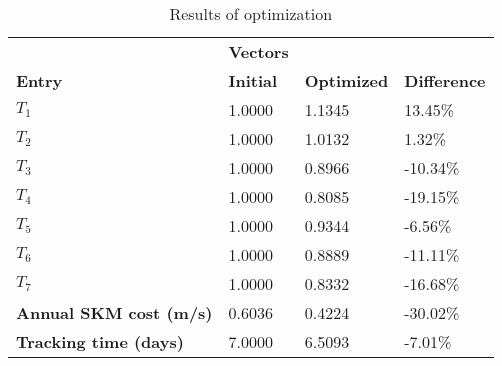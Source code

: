 \begin{table}[H]
\centering
\begin{tabular}{llll}
\textbf{}      & \cellcolor[HTML]{EFEFEF}\textbf{Vectors} & \textbf{} & \textbf{}         \\
\rowcolor[HTML]{EFEFEF} 
\textbf{Entry} & \textbf{Initial} & \textbf{Optimized} & \textbf{Difference} \\
$T_1$ & 1.0000 & 1.1345 & 13.45\% \\ 
$T_2$ & 1.0000 & 1.0132 & 1.32\% \\ 
$T_3$ & 1.0000 & 0.8966 & -10.34\% \\ 
$T_4$ & 1.0000 & 0.8085 & -19.15\% \\ 
$T_5$ & 1.0000 & 0.9344 & -6.56\% \\ 
$T_6$ & 1.0000 & 0.8889 & -11.11\% \\ 
$T_7$ & 1.0000 & 0.8332 & -16.68\% \\ 
\rowcolor[HTML]{EFEFEF} 
\textbf{Annual SKM cost (m/s)}  & 0.6036 & 0.4224 & -30.02\% \\ 
\rowcolor[HTML]{EFEFEF} 
\textbf{Tracking time (days)}  & 7.0000 & 6.5093 & -7.01\% \\ 
\end{tabular}
\caption{Results of optimization}
\label{tab:OptimizationAnalysis}
\end{table}